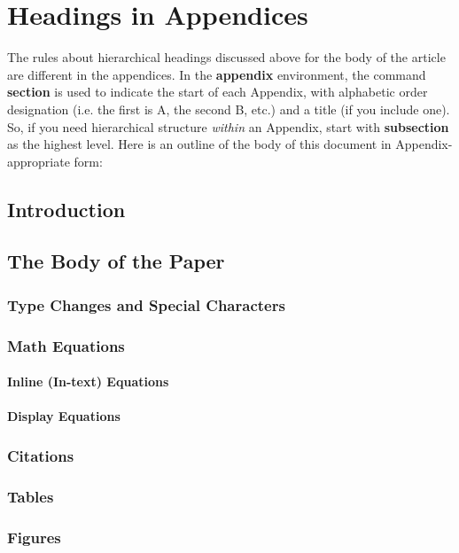 \documentclass{style/nime-alternate}
\begin{document}
	 


%
%
\appendix
\section{Headings in Appendices}
The rules about hierarchical headings discussed above for
the body of the article are different in the appendices.
In the \textbf{appendix} environment, the command
\textbf{section} is used to
indicate the start of each Appendix, with alphabetic order
designation (i.e. the first is A, the second B, etc.) and
a title (if you include one).  So, if you need
hierarchical structure
\textit{within} an Appendix, start with \textbf{subsection} as the
highest level. Here is an outline of the body of this
document in Appendix-appropriate form:
\subsection{Introduction}
\subsection{The Body of the Paper}
\subsubsection{Type Changes and  Special Characters}
\subsubsection{Math Equations}
\paragraph{Inline (In-text) Equations}
\paragraph{Display Equations}
\subsubsection{Citations}
\subsubsection{Tables}
\subsubsection{Figures}
\end{document}
